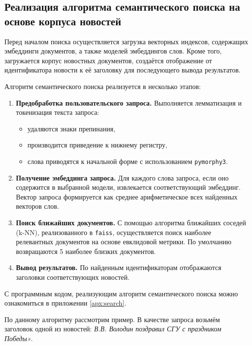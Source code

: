 \documentclass[coursework]{SCWorks}
\begin{document}
\subsection{Реализация алгоритма семантического поиска на основе корпуса новостей}

Перед началом поиска осуществляется загрузка векторных индексов, содержащих эмбеддинги документов, а также моделей эмбеддингов слов. Кроме того, загружается корпус новостных документов, создаётся отображение от идентификатора новости к её заголовку для последующего вывода результатов.

Алгоритм семантического поиска реализуется в несколько этапов:
\begin{enumerate}
    \item \textbf{Предобработка пользовательского запроса.}
    Выполняется лемматизация и токенизация текста запроса:
    \begin{itemize}
        \item удаляются знаки препинания,
        \item производится приведение к нижнему регистру,
        \item слова приводятся к начальной форме с использованием \texttt{pymorphy3}.
    \end{itemize}

    \item \textbf{Получение эмбеддинга запроса.}
    Для каждого слова запроса, если оно содержится в выбранной модели, извлекается соответствующий эмбеддинг. Вектор запроса формируется как среднее арифметическое всех найденных векторов слов.

    \item \textbf{Поиск ближайших документов.}
    С помощью алгоритма ближайших соседей (k-NN), реализованного в \texttt{faiss}, осуществляется поиск наиболее релевантных документов на основе евклидовой метрики. По умолчанию возвращаются 5 наиболее близких документов.

    \item \textbf{Вывод результатов.}
    По найденным идентификаторам отображаются заголовки соответствующих новостей.
\end{enumerate}

С программным кодом, реализующим алгоритм семантического поиска можно ознакомиться в приложении \ref{apx:search}.

По данному алгоритму рассмотрим пример. В качестве запроса возьмём заголовок одной из новостей: \textit{В.В. Володин поздравил СГУ с праздником Победы»}.
\end{document}
